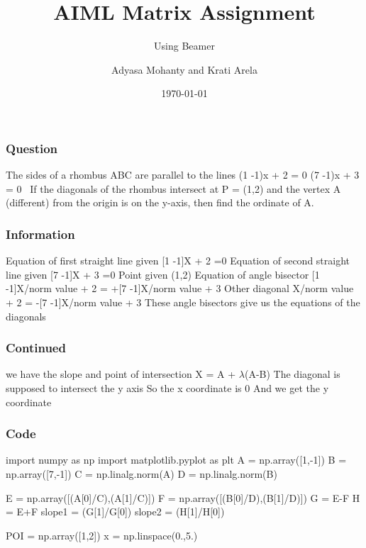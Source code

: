 \documentclass{beamer}
\title{AIML Matrix Assignment}
\subtitle{Using Beamer}
\author{Adyasa Mohanty and Krati Arela}
\institute{IIT Hyderabad}
\date{\today}
\begin{document}
\begin{frame}
\titlepage
\end{frame}

\begin{frame}
\frametitle{Question}
The sides of a rhombus ABC are parallel to the lines 
\linebreak (1 -1)x + 2 = 0
\linebreak(7 -1)x + 3 = 0
\linebreak\ If the diagonals of the rhombus intersect at P = (1,2) and the vertex A (different) from the origin is on the y-axis, then find the ordinate of A. 
\end{frame}

\begin{frame}
\frametitle{Information}
Equation of first straight line given [1 -1]X + 2 =0
\linebreak Equation of second straight line given [7 -1]X + 3 =0
\linebreak Point given (1,2)
\linebreak Equation of angle bisector [1 -1]X/norm value + 2 = +[7 -1]X/norm value + 3
\linebreak Other diagonal
\linebreak [1 -1]X/norm value + 2 = -[7 -1]X/norm value + 3
\linebreak These angle bisectors give us the equations of the diagonals
\end{frame}

\begin{frame}
\frametitle{Continued}
\linebreak we have the slope and point of intersection
\linebreak X = A + $\lambda$(A-B)
\linebreak The diagonal is supposed to intersect the y axis
\linebreak So the x coordinate is 0
\linebreak And we get the y coordinate
\end{frame}


\begin{frame}[fragile]
\frametitle{Code}
\begin{semiverbatim}
import numpy as np
import matplotlib.pyplot as plt
A = np.array([1,-1])
B = np.array([7,-1])
C = np.linalg.norm(A)
D = np.linalg.norm(B)

E = np.array([(A[0]/C),(A[1]/C)])
F = np.array([(B[0]/D),(B[1]/D)])
G = E-F
H = E+F
slope1 = (G[1]/G[0])
slope2 = (H[1]/H[0])

POI = np.array([1,2])
x = np.linspace(0.,5.)
\end{semiverbatim}
\end{frame}
\end{document}
